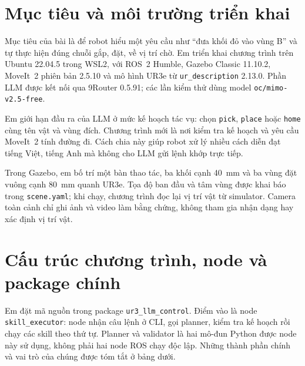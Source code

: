 \documentclass[11pt,a4paper]{article}
\begin{document}
\section{Mục tiêu và môi trường triển khai}
Mục tiêu của bài là để robot hiểu một yêu cầu như ``đưa khối đỏ vào vùng B''
và tự thực hiện đúng chuỗi gắp, đặt, về vị trí chờ. Em triển khai chương trình
trên Ubuntu 22.04.5 trong WSL2, với ROS~2 Humble, Gazebo Classic 11.10.2,
MoveIt~2 phiên bản 2.5.10 và mô hình UR3e từ \texttt{ur\_description} 2.13.0.
Phần LLM được kết nối qua 9Router 0.5.91; các lần kiểm thử dùng model
\texttt{oc/mimo-v2.5-free}.

Em giới hạn đầu ra của LLM ở mức kế hoạch tác vụ: chọn \texttt{pick},
\texttt{place} hoặc \texttt{home} cùng tên vật và vùng đích. Chương trình mới
là nơi kiểm tra kế hoạch và yêu cầu MoveIt~2 tính đường đi. Cách chia này giúp
robot xử lý nhiều cách diễn đạt tiếng Việt, tiếng Anh mà không cho LLM gửi
lệnh khớp trực tiếp.

Trong Gazebo, em bố trí một bàn thao tác, ba khối cạnh 40~mm và ba vùng đặt
vuông cạnh 80~mm quanh UR3e. Tọa độ ban đầu và tâm vùng được khai báo trong
\texttt{scene.yaml}; khi chạy, chương trình đọc lại vị trí vật từ simulator.
Camera toàn cảnh chỉ ghi ảnh và video làm bằng chứng, không tham gia nhận dạng
hay xác định vị trí vật.

\section{Cấu trúc chương trình, node và package chính}
Em đặt mã nguồn trong package \texttt{ur3\_llm\_control}. Điểm vào là node
\texttt{skill\_executor}: node nhận câu lệnh ở CLI, gọi planner, kiểm tra kế
hoạch rồi chạy các skill theo thứ tự. Planner và validator là hai mô-đun Python
được node này sử dụng, không phải hai node ROS chạy độc lập. Những thành phần
chính và vai trò của chúng được tóm tắt ở bảng dưới.
\end{document}
